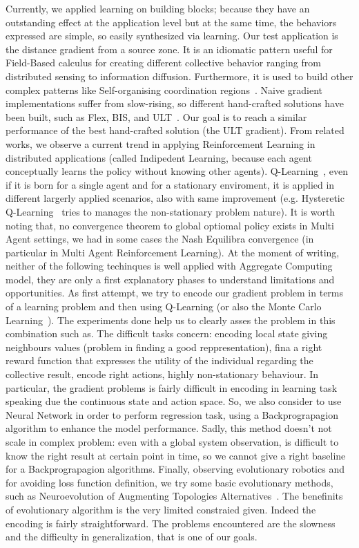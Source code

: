 \documentclass[conference]{IEEEtran}
\begin{document}
Currently, we applied learning on building blocks; because they have an outstanding effect at the application level but
at the same time, the behaviors expressed are simple, so easily synthesized via learning.  %
%
Our test application is the distance gradient from a source zone. 
It is an idiomatic pattern useful for Field-Based calculus for creating different collective behavior ranging from distributed sensing to information diffusion.
Furthermore, it is used to build other complex patterns like Self-organising coordination regions~\cite{DBLP:conf/coordination/CasadeiPVN19}.
%
Naive gradient implementations suffer from slow-rising, so different hand-crafted solutions have been built, such as Flex, BIS, and ULT~\cite{DBLP:conf/saso/AudritoCDV17}.
Our goal is to reach a similar performance of the best hand-crafted solution (the ULT gradient).
%
From related works, we observe a current trend in applying Reinforcement Learning in distributed applications (called Indipedent Learning, because each agent conceptually learns the policy without knowing other agents).
Q-Learning~\cite{DBLP:journals/ras/Krose95}, even if it is born for a single agent and for a stationary enviroment, it is applied in 
different largerly applied scenarios, also with same improvement (e.g. Hysteretic Q-Learning~\cite{DBLP:conf/iros/MatignonLF07} tries to 
manages the non-stationary problem nature). It is worth noting that, no convergence theorem to global optiomal policy exists in Multi Agent settings, we had in some cases
the Nash Equilibra convergence (in particular in Multi Agent Reinforcement Learning).
%
At the moment of writing, neither of the following techinques is well applied with Aggregate Computing model, they are
only a first explanatory phases to understand limitations and opportunities.
%
As first attempt, we try to encode our gradient problem in terms of a learning problem and then using Q-Learning (or also the Monte Carlo Learning~\cite{DBLP:conf/nips/Thrun99}).
The experiments done help us to clearly asses the problem in this combination such as. 
The difficult tasks concern: encoding local state giving neighbours values (problem in finding a good reppresentation), fina a right reward function that expresses the utility of 
the individual regarding the collective result, encode right actions, highly non-stationary behaviour. 
In particular, the gradient problems is fairly difficult in encoding in learning task speaking due the continuous state and action space.
So, we also consider to use Neural Network in order to perform regression task, using a Backprograpagion algorithm to 
enhance the model performance. 
Sadly, this method doesn't not scale in complex problem: even with a global system observation, is difficult to know the right result at certain point in time, so 
we cannot give a right baseline for a Backprograpagion algorithms.
%
Finally, observing evolutionary robotics and for avoiding loss function definition, we try some basic evolutionary methods, such as Neuroevolution of Augmenting Topologies Alternatives~\cite{DBLP:journals/ec/StanleyM02}.
The benefinits of evolutionary algorithm is the very limited constraied given. Indeed the encoding is fairly straightforward.
The problems encountered are the slowness and the difficulty in generalization, that is one of our goals.
%
\end{document}
